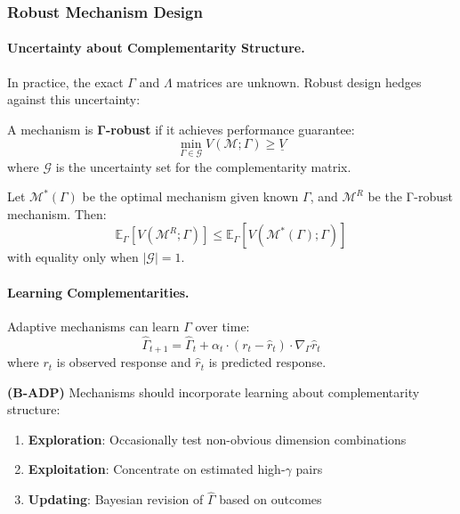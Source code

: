\subsubsection{Robust Mechanism Design}

\paragraph{Uncertainty about Complementarity Structure.}

In practice, the exact $\Gamma$ and $\Lambda$ matrices are unknown. Robust design 
hedges against this uncertainty:

\begin{definition}
\label{def:gamma-robust}
A mechanism is \textbf{Γ-robust} if it achieves performance guarantee:
\begin{equation}
\min_{\Gamma \in \mathcal{G}} V(\mathcal{M}; \Gamma) \geq \underline{V}
\end{equation}
where $\mathcal{G}$ is the uncertainty set for the complementarity matrix.
\end{definition}

\begin{proposition}
\label{prop:robust-tradeoff}
Let $\mathcal{M}^*(\Gamma)$ be the optimal mechanism given known $\Gamma$, and 
$\mathcal{M}^R$ be the Γ-robust mechanism. Then:
\begin{equation}
\mathbb{E}_{\Gamma}[V(\mathcal{M}^R; \Gamma)] \leq \mathbb{E}_{\Gamma}[V(\mathcal{M}^*(\Gamma); \Gamma)]
\end{equation}
with equality only when $|\mathcal{G}| = 1$.
\end{proposition}

\paragraph{Learning Complementarities.}

Adaptive mechanisms can learn $\Gamma$ over time:
\begin{equation}
\hat{\Gamma}_{t+1} = \hat{\Gamma}_t + \alpha_t \cdot (r_t - \hat{r}_t) \cdot \nabla_{\Gamma} \hat{r}_t
\end{equation}
where $r_t$ is observed response and $\hat{r}_t$ is predicted response.

\begin{axiom}
\label{ax:B-ADP}
\textbf{(B-ADP)} Mechanisms should incorporate learning about complementarity structure:
\begin{enumerate}
    \item \textbf{Exploration}: Occasionally test non-obvious dimension combinations
    \item \textbf{Exploitation}: Concentrate on estimated high-$\gamma$ pairs
    \item \textbf{Updating}: Bayesian revision of $\hat{\Gamma}$ based on outcomes
\end{enumerate}
\end{axiom}

